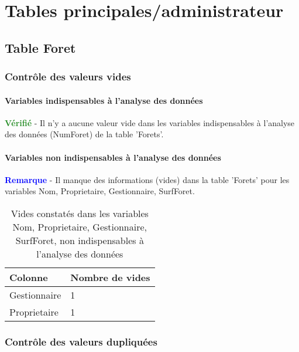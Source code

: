 \documentclass[a4paper]{article}
\begin{document}
\tableofcontents
\thispagestyle{empty} %
\setcounter{page}{0}
\newpage

\section{Tables principales/administrateur}
\subsection{Table Foret}
\subsubsection{Contrôle des valeurs vides}
\paragraph{Variables indispensables à l'analyse des données}
\textcolor{ForestGreen}{\textbf{Vérifié}} - Il n'y a aucune valeur vide dans les variables indispensables à l'analyse des données (NumForet) de la table 'Forets'. \\ 

\paragraph{Variables non indispensables à l'analyse des données}
\textcolor{blue}{\textbf{Remarque}} - Il manque des informations (vides) dans la table 'Forets' pour les variables Nom, Proprietaire, Gestionnaire, SurfForet. \\ 

\begin{table}[ht]
\centering
\begingroup\scriptsize
\begin{tabular}{|M{2cm}|M{1cm}|}
  \hline
Colonne & Nombre de vides \\ 
  \hline
Gestionnaire & 1 \\ 
   \hline
Proprietaire & 1 \\ 
   \hline
\end{tabular}
\endgroup
\caption{\footnotesize{Vides constatés dans les variables Nom, Proprietaire, Gestionnaire, SurfForet, non indispensables à l'analyse des données}} 
\label{Forets-missing_values_for_non_essential_vars}
\end{table}
\FloatBarrier
\subsubsection{Contrôle des valeurs dupliquées}
\end{document}
